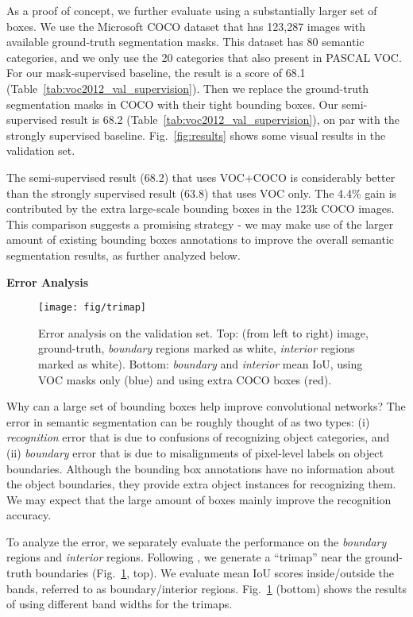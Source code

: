 \documentclass[10pt,twocolumn,letterpaper]{article}
\begin{document}
As a proof of concept, we further evaluate using a substantially larger set of boxes. We use the Microsoft COCO dataset \cite{Lin2014} that has 123,287 images with available ground-truth segmentation masks. This dataset has 80 semantic categories, and we only use the 20 categories that also present in PASCAL VOC. For our mask-supervised baseline, the result is a score of 68.1 (Table~\ref{tab:voc2012_val_supervision}). Then we replace the ground-truth segmentation masks in COCO with their tight bounding boxes. Our semi-supervised result is 68.2 (Table~\ref{tab:voc2012_val_supervision}), on par with the strongly supervised baseline. Fig.~\ref{fig:results} shows some visual results in the validation set.

The semi-supervised result (68.2) that uses VOC+COCO is considerably better than the strongly supervised result (63.8) that uses VOC only. The 4.4\% gain is contributed by the extra large-scale bounding boxes in the 123k COCO images. This comparison suggests a promising strategy - we may make use of the larger amount of existing bounding boxes annotations to improve the overall semantic segmentation results, as further analyzed below.

\vspace{8pt}
\noindent\textbf{Error Analysis}

\begin{figure}[t]
\centering
\texttt{[image: fig/trimap]}
\caption{Error analysis on the validation set. Top: (from left to right) image, ground-truth, \emph{boundary} regions marked as white, \emph{interior} regions marked as white). Bottom: \emph{boundary} and \emph{interior} mean IoU, using VOC masks only (blue) and using extra COCO boxes (red).}
\label{fig:trimap}
\end{figure}


Why can a large set of bounding boxes help improve convolutional networks? The error in semantic segmentation can be roughly thought of as two types: (i) \emph{recognition} error that is due to confusions of recognizing object categories, and (ii) \emph{boundary} error that is due to misalignments of pixel-level labels on object boundaries. Although the bounding box annotations have no information about the object boundaries, they provide extra object instances for recognizing them. We may expect that the large amount of boxes mainly improve the recognition accuracy.

To analyze the error, we separately evaluate the performance on the \emph{boundary} regions and \emph{interior} regions. Following \cite{Kohli2009,Chen2015}, we generate a ``trimap'' near the ground-truth boundaries (Fig.~\ref{fig:trimap}, top). We evaluate mean IoU scores inside/outside the bands, referred to as boundary/interior regions. Fig.~\ref{fig:trimap} (bottom) shows the results of using different band widths for the trimaps.
\end{document}
